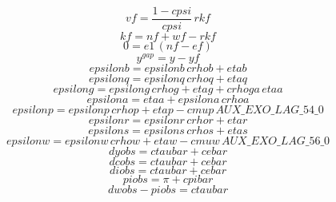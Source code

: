 \begin{dmath}
{vf}=\frac{1-{cpsi}}{{cpsi}}\, {rkf}
\end{dmath}
\begin{dmath}
{kf}={nf}+{wf}-{rkf}
\end{dmath}
\begin{dmath}
0={e1}\, \left({nf}-{ef}\right)
\end{dmath}
\begin{dmath}
{{y^{gap}}}={{y}}-{yf}
\end{dmath}
\begin{dmath}
{epsilonb}={epsilonb}\, {crhob}+{etab}
\end{dmath}
\begin{dmath}
{epsilonq}={epsilonq}\, {crhoq}+{etaq}
\end{dmath}
\begin{dmath}
{epsilong}={epsilong}\, {crhog}+{etag}+{crhoga}\, {etaa}
\end{dmath}
\begin{dmath}
{epsilona}={etaa}+{epsilona}\, {crhoa}
\end{dmath}
\begin{dmath}
{epsilonp}={epsilonp}\, {crhop}+{etap}-{cmup}\, {AUX\_EXO\_LAG\_54\_0}
\end{dmath}
\begin{dmath}
{epsilonr}={epsilonr}\, {crhor}+{etar}
\end{dmath}
\begin{dmath}
{epsilons}={epsilons}\, {crhos}+{etas}
\end{dmath}
\begin{dmath}
{epsilonw}={epsilonw}\, {crhow}+{etaw}-{cmuw}\, {AUX\_EXO\_LAG\_56\_0}
\end{dmath}
\begin{dmath}
{dyobs}={ctaubar}+{cebar}
\end{dmath}
\begin{dmath}
{dcobs}={ctaubar}+{cebar}
\end{dmath}
\begin{dmath}
{diobs}={ctaubar}+{cebar}
\end{dmath}
\begin{dmath}
{piobs}={{\pi}}+{cpibar}
\end{dmath}
\begin{dmath}
{dwobs}-{piobs}={ctaubar}
\end{dmath}
